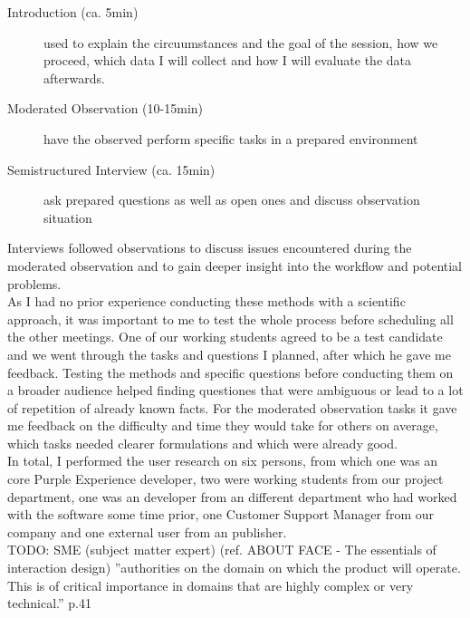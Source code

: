 \begin{description}
  \item [Introduction (ca. 5min)] used to explain the circuumstances and the goal of the session, how we proceed, which data I will collect and how I will evaluate the data afterwards.
  \item [Moderated Observation (10-15min)] have the observed perform specific tasks in a prepared environment
  \item [Semistructured Interview (ca. 15min)] ask prepared questions as well as open ones and discuss observation situation
\end{description}
Interviews followed observations to discuss issues encountered during the moderated observation and to gain deeper insight into the workflow and potential problems.
\\
As I had no prior experience conducting these methods with a scientific approach, it was important to me to test the whole process before scheduling all the other meetings. One of our working students agreed to be a test candidate and we went through the tasks and questions I planned, after which he gave me feedback.
Testing the methods and specific questions before conducting them on a broader audience helped finding questiones that were ambiguous or lead to a lot of repetition of already known facts. For the moderated observation tasks it gave me feedback on the difficulty and time they would take for others on average, which tasks needed clearer formulations and which were already good.
\\
In total, I performed the user research on six persons, from which one was an core Purple Experience developer, two were working students from our project department, one was an developer from an different department who had worked with the software some time prior, one Customer Support Manager from our company and one external user from an publisher.
\\
TODO: SME (subject matter expert) (ref. ABOUT FACE - The essentials of interaction design) ''authorities on the domain on which the product will operate. This is of critical importance in domains that are highly complex or very technical.'' p.41

